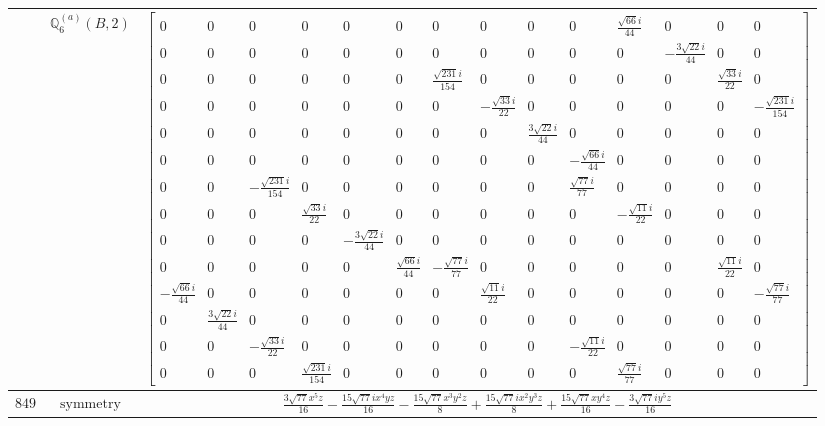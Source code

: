 \documentclass[fleqn,8pt,landscape]{jsarticle}
\begin{document}
\begin{longtable}{ccc}
$  $ & $ \mathbb{Q}_{6}^{(a)}(B,2) $ & $ \begin{bmatrix} 0 & 0 & 0 & 0 & 0 & 0 & 0 & 0 & 0 & 0 & \frac{\sqrt{66} i}{44} & 0 & 0 & 0 \\ 0 & 0 & 0 & 0 & 0 & 0 & 0 & 0 & 0 & 0 & 0 & - \frac{3 \sqrt{22} i}{44} & 0 & 0 \\ 0 & 0 & 0 & 0 & 0 & 0 & \frac{\sqrt{231} i}{154} & 0 & 0 & 0 & 0 & 0 & \frac{\sqrt{33} i}{22} & 0 \\ 0 & 0 & 0 & 0 & 0 & 0 & 0 & - \frac{\sqrt{33} i}{22} & 0 & 0 & 0 & 0 & 0 & - \frac{\sqrt{231} i}{154} \\ 0 & 0 & 0 & 0 & 0 & 0 & 0 & 0 & \frac{3 \sqrt{22} i}{44} & 0 & 0 & 0 & 0 & 0 \\ 0 & 0 & 0 & 0 & 0 & 0 & 0 & 0 & 0 & - \frac{\sqrt{66} i}{44} & 0 & 0 & 0 & 0 \\ 0 & 0 & - \frac{\sqrt{231} i}{154} & 0 & 0 & 0 & 0 & 0 & 0 & \frac{\sqrt{77} i}{77} & 0 & 0 & 0 & 0 \\ 0 & 0 & 0 & \frac{\sqrt{33} i}{22} & 0 & 0 & 0 & 0 & 0 & 0 & - \frac{\sqrt{11} i}{22} & 0 & 0 & 0 \\ 0 & 0 & 0 & 0 & - \frac{3 \sqrt{22} i}{44} & 0 & 0 & 0 & 0 & 0 & 0 & 0 & 0 & 0 \\ 0 & 0 & 0 & 0 & 0 & \frac{\sqrt{66} i}{44} & - \frac{\sqrt{77} i}{77} & 0 & 0 & 0 & 0 & 0 & \frac{\sqrt{11} i}{22} & 0 \\ - \frac{\sqrt{66} i}{44} & 0 & 0 & 0 & 0 & 0 & 0 & \frac{\sqrt{11} i}{22} & 0 & 0 & 0 & 0 & 0 & - \frac{\sqrt{77} i}{77} \\ 0 & \frac{3 \sqrt{22} i}{44} & 0 & 0 & 0 & 0 & 0 & 0 & 0 & 0 & 0 & 0 & 0 & 0 \\ 0 & 0 & - \frac{\sqrt{33} i}{22} & 0 & 0 & 0 & 0 & 0 & 0 & - \frac{\sqrt{11} i}{22} & 0 & 0 & 0 & 0 \\ 0 & 0 & 0 & \frac{\sqrt{231} i}{154} & 0 & 0 & 0 & 0 & 0 & 0 & \frac{\sqrt{77} i}{77} & 0 & 0 & 0 \end{bmatrix} $ \\ \hline
$ 849 $ & $ \text{symmetry} $ & $ \frac{3 \sqrt{77} x^{5} z}{16} - \frac{15 \sqrt{77} i x^{4} y z}{16} - \frac{15 \sqrt{77} x^{3} y^{2} z}{8} + \frac{15 \sqrt{77} i x^{2} y^{3} z}{8} + \frac{15 \sqrt{77} x y^{4} z}{16} - \frac{3 \sqrt{77} i y^{5} z}{16} $ \\

\end{longtable}
\end{document}
